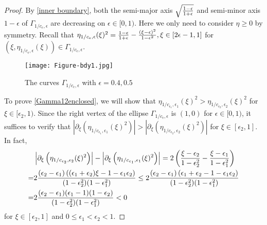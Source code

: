 \documentclass[1 [leqno, 11pt]{amsart}
\numberwithin{equation}{section}
\let\ep=\epsilon
\begin{document}
\begin{CJK*}{GBK}{song}
\begin{proof}
By \eqref{inner boundary}, both the semi-major axis $\sqrt{1-\ep\over1+\ep}$  and semi-minor axis $1-\ep$ of $\Gamma_{1/c_{\ep},{\ep}}$ are decreasing on $\ep\in[0,1)$. Here
we only need to consider $\eta\geq0$ by symmetry.
Recall that $\eta_{1/c_\ep,\ep}(\xi)^2={1-\ep\over 1+\ep}-\frac{(\xi - \ep)^2}{1-\ep^2}, \xi\in[2\ep-1,1]$ for $(\xi,\eta_{1/c_\ep,\ep}(\xi))\in \Gamma_{1/c_{\ep},{\ep}}$.
\begin{figure}[ht]
    \centering
	\texttt{[image: Figure-bdy1.jpg]}
	\caption{The curves  $\Gamma_{1/c_\ep,\ep}$ with $\ep=0.4, 0.5$}
	\label{fig5th:bdy1}
\end{figure}
To prove \eqref{Gamma12enclosed}, we will show that $\eta_{1/c_{\ep_1},\ep_1}(\xi)^2>\eta_{1/c_{\ep_2},\ep_2}(\xi)^2$ for $\xi\in[\ep_2,1)$.
Since the right vertex of the ellipse $\Gamma_{1/c_{\ep},{\ep}}$ is  $(1,0)$ for $\ep\in[0,1)$, it suffices to verify that $\left|\partial_{\xi}\left(\eta_{1/c_{\ep_1},\ep_1}(\xi)^2\right)\right|>\left|\partial_{\xi}\left(\eta_{1/c_{\ep_2},\ep_2}(\xi)^2\right)\right|$ for $\xi\in[\ep_2,1]$. In fact,
\begin{align*}
&\left|\partial_{\xi}\left(\eta_{1/c_{\ep_2},\ep_2}(\xi)^2\right)\right|-\left|\partial_{\xi}\left(\eta_{1/c_{\ep_1},\ep_1}(\xi)^2\right)\right|=2\left(\frac{\xi - \ep_2}{1-\ep_2^2}-\frac{\xi - \ep_1}{1-\ep_1^2}\right)\\
=&2{(\ep_2-\ep_1)\left((\ep_1+\ep_2)\xi-1-\ep_1\ep_2\right)\over (1-\ep_2^2)(1-\ep_1^2)}\leq 2{(\ep_2-\ep_1)\left(\ep_1+\ep_2-1-\ep_1\ep_2\right)\over (1-\ep_2^2)(1-\ep_1^2)}\\
=&2{(\ep_2-\ep_1)(\ep_1-1)(1-\ep_2)\over (1-\ep_2^2)(1-\ep_1^2)}<0
\end{align*}
 for $\xi\in[\ep_2,1]$ and $0\leq \ep_1< \ep_2<1$.

 \vspace{0.5mm}




\end{proof}
\end{CJK*}
\end{document}
